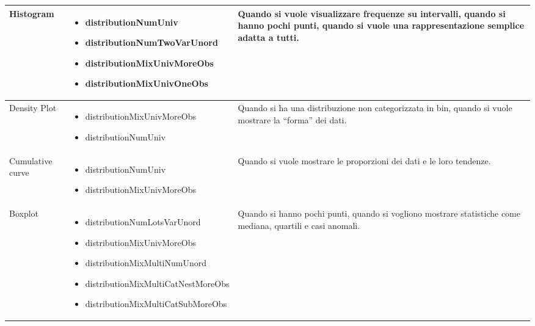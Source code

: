\begin{xltabular}{\columnwidth}{|p{0.15\columnwidth}|X|p{0.27\columnwidth}|}
    \hline
    Histogram & 
    \vspace{-3.5mm}
    \begin{itemize}[noitemsep,topsep=0pt, left=0pt]
        \item distributionNumUniv
        \item distributionNumTwoVarUnord
        \item distributionMixUnivMoreObs
        \item distributionMixUnivOneObs
    \end{itemize} & 
    Quando si vuole visualizzare frequenze su intervalli, quando si hanno pochi punti, quando si vuole una rappresentazione semplice adatta a tutti. \\
    \hline
    Density Plot & 
    \vspace{-3.5mm}
    \begin{itemize}[noitemsep,topsep=0pt, left=0pt]
        \item distributionMixUnivMoreObs
        \item distributionNumUniv
    \end{itemize} & 
    Quando si ha una distribuzione non categorizzata in bin, quando si vuole mostrare la ``forma'' dei dati. \\
    \hline
    Cumulative curve & 
    \vspace{-3.5mm}
    \begin{itemize}[noitemsep,topsep=0pt, left=0pt]
        \item distributionNumUniv
        \item distributionMixUnivMoreObs
    \end{itemize} & 
    Quando si vuole mostrare le proporzioni dei dati e le loro tendenze. \\
    \hline
    Boxplot & 
    \vspace{-3.5mm}
    \begin{itemize}[noitemsep,topsep=0pt, left=0pt]
        \item distributionNumLotsVarUnord
        \item distributionMixUnivMoreObs
        \item distributionMixMultiNumUnord
        \item distributionMixMultiCatNestMoreObs
        \item distributionMixMultiCatSubMoreObs
    \end{itemize} & 
    Quando si hanno pochi punti, quando si vogliono mostrare statistiche come mediana, quartili e casi anomali. \\

\end{xltabular}
